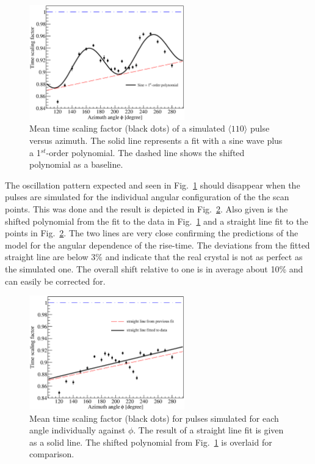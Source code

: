 \begin{figure}[htbp]
\centering
\includegraphics[width=0.6\textwidth]{tsc}
\caption{Mean time scaling factor (black dots) of a simulated $\langle
110 \rangle$ pulse versus azimuth. The solid line represents a fit
with a sine wave plus a 1$^{st}$-order polynomial. The dashed line
shows the shifted polynomial as a baseline.}
\label{fig:psa:tsc}
\end{figure}

The oscillation pattern expected and seen in Fig.~\ref{fig:psa:tsc}
should disappear when the pulses are simulated for the individual
angular configuration of the the scan points. This was done and the
result is depicted in Fig.~\ref{fig:psa:tsl}. Also given is the
shifted polynomial from the fit to the data in Fig.~\ref{fig:psa:tsc}
and a straight line fit to the points in Fig.~\ref{fig:psa:tsl}. The
two lines are very close confirming the predictions of the model for
the angular dependence of the rise-time. The deviations from the
fitted straight line are below 3\% and indicate that the real crystal
is not as perfect as the simulated one. The overall shift relative to
one is in average about 10\% and can easily be corrected for.

\begin{figure}[htbp]
\centering
\includegraphics[width=0.6\textwidth]{tsline}
\caption{Mean time scaling factor (black dots) for pulses simulated
for each angle individually against $\phi$. The result of a straight
line fit is given as a solid line. The shifted polynomial from
Fig.~\ref{fig:psa:tsc} is overlaid for comparison.}
\label{fig:psa:tsl}
\end{figure}


